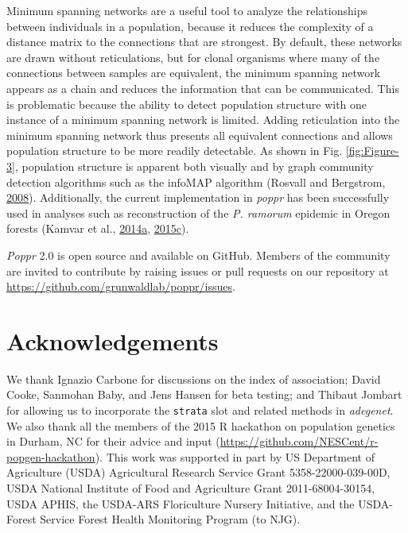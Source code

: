 \documentclass[double,12pt]{beavtex}
\begin{document}
  Minimum spanning networks are a useful tool to analyze the relationships
  between individuals in a population, because it reduces the complexity
  of a distance matrix to the connections that are strongest. By default,
  these networks are drawn without reticulations, but for clonal organisms
  where many of the connections between samples are equivalent, the
  minimum spanning network appears as a chain and reduces the information
  that can be communicated. This is problematic because the ability to
  detect population structure with one instance of a minimum spanning
  network is limited. Adding reticulation into the minimum spanning
  network thus presents all equivalent connections and allows population
  structure to be more readily detectable. As shown in Fig.
  \ref{fig:Figure-3}, population structure is apparent both visually and
  by graph community detection algorithms such as the infoMAP algorithm
  (Rosvall and Bergstrom, \protect\hyperlink{ref-rosvall2008maps}{2008}).
  Additionally, the current implementation in \emph{poppr} has been
  successfully used in analyses such as reconstruction of the \emph{P.
  ramorum} epidemic in Oregon forests (Kamvar et al.,
  \protect\hyperlink{ref-kamvar2014sudden}{2014}\protect\hyperlink{ref-kamvar2014sudden}{a},
  \protect\hyperlink{ref-kamvar2015spatial}{2015}\protect\hyperlink{ref-kamvar2015spatial}{c}).
  
  \emph{Poppr} 2.0 is open source and available on GitHub. Members of the
  community are invited to contribute by raising issues or pull requests
  on our repository at \url{https://github.com/grunwaldlab/poppr/issues}.
  
  \newpage
  
  \section{Acknowledgements}\label{acknowledgements-1}
  
  We thank Ignazio Carbone for discussions on the index of association;
  David Cooke, Sanmohan Baby, and Jens Hansen for beta testing; and
  Thibaut Jombart for allowing us to incorporate the \texttt{strata} slot
  and related methods in \emph{adegenet}. We also thank all the members of
  the 2015 R hackathon on population genetics in Durham, NC for their
  advice and input (\url{https://github.com/NESCent/r-popgen-hackathon}).
  This work was supported in part by US Department of Agriculture (USDA)
  Agricultural Research Service Grant 5358-22000-039-00D, USDA National
  Institute of Food and Agriculture Grant 2011-68004-30154, USDA APHIS,
  the USDA-ARS Floriculture Nursery Initiative, and the USDA-Forest
  Service Forest Health Monitoring Program (to NJG).
  
\end{document}
